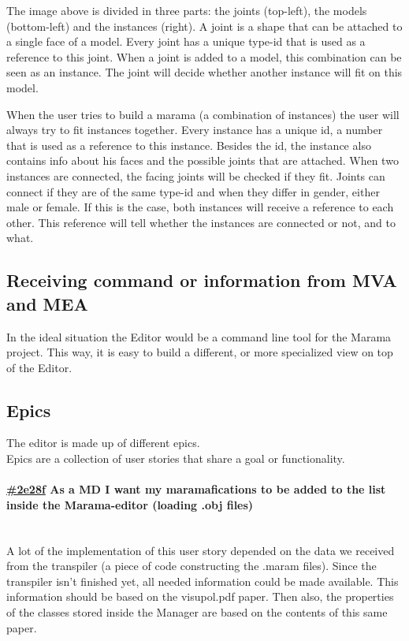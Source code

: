 \documentclass[10pt]{extarticle} %
\newcommand{\myparagraph}[1]{\paragraph{#1}\mbox{}\\} %
\begin{document}
    The image above is divided in three parts: the joints (top-left), the models (bottom-left) and the instances (right).
    A joint is a shape that can be attached to a single face of a model.
    Every joint has a unique type-id that is used as a reference to this joint.
    When a joint is added to a model, this combination can be seen as an instance.
    The joint will decide whether another instance will fit on this model.

    When the user tries to build a marama (a combination of instances) the user will always try to fit instances together.
    Every instance has a unique id, a number that is used as a reference to this instance.
    Besides the id, the instance also contains info about his faces and the possible joints that are attached.
    When two instances are connected, the facing joints will be checked if they fit.
    Joints can connect if they are of the same type-id and when they differ in gender, either male or female.
    If this is the case, both instances will receive a reference to each other.
    This reference will tell whether the instances are connected or not, and to what.
    \subsection[Communication MVA-MEA]{Receiving command or information from MVA and MEA}
    \label{subsec:comchoice}
    In the ideal situation the Editor would be a command line tool for the Marama project.
    This way, it is easy to build a different, or more specialized view on top of the Editor.

    \subsection{Epics}
    \label{subsec:epics}
    The editor is made up of different epics.\\
    Epics are a collection of user stories that share a goal or functionality.

    \newcommand{\clickup}[1]{https://app.clickup.com/757520/761304/t/#1}

    \myparagraph{\href{\clickup{2e28f}}{\#2e28f} As a MD I want my maramafications to be added to the list inside the Marama-editor (loading .obj files)}
    A lot of the implementation of this user story depended on the data we received from the transpiler (a piece of code constructing the .maram files).
    Since the transpiler isn't finished yet, all needed information could be made available.
    This information should be based on the visupol.pdf\cite{visupol} paper.
    Then also, the properties of the classes stored inside the Manager are based on the contents of this same paper.
\end{document}
